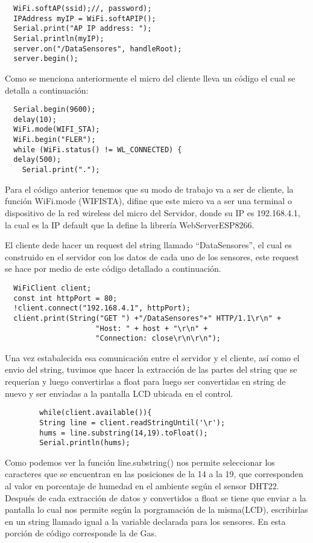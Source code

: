 \documentclass[12pt,letterpaper]{IEEEtran}
\begin{document}
 \begin{lstlisting}
  WiFi.softAP(ssid);//, password);      
  IPAddress myIP = WiFi.softAPIP();    
  Serial.print("AP IP address: ");
  Serial.println(myIP);              
  server.on("/DataSensores", handleRoot);   
  server.begin();
 \end{lstlisting}
 
 Como se menciona anteriormente el micro del cliente lleva un código el cual se detalla a continuación:
 
   \begin{lstlisting}
  Serial.begin(9600);        
  delay(10);                            
  WiFi.mode(WIFI_STA);          
  WiFi.begin("FLER");     
  while (WiFi.status() != WL_CONNECTED) {    
  delay(500);
    Serial.print(".");
   \end{lstlisting}
 Para el código anterior tenemos que su modo de trabajo va a ser de cliente, la función WiFi.mode (WIFI\textunderscore STA), difine que este micro va a ser una terminal o dispositivo de la red wireless del micro del Servidor, donde su IP es 192.168.4.1, la cual es la IP default que la define la librería WebServerESP8266. 

El cliente dede hacer un request del string llamado ``DataSensores'', el cual es construido en el servidor con los datos de cada uno de los sensores, este request se hace por medio de este código detallado a continuación. 
 
  
\begin{lstlisting}
  WiFiClient client;
  const int httpPort = 80;
  !client.connect("192.168.4.1", httpPort);
  client.print(String("GET ") +"/DataSensores"+" HTTP/1.1\r\n" +
                     "Host: " + host + "\r\n" +
                     "Connection: close\r\n\r\n"); 
\end{lstlisting}

Una vez estabalecida esa comunicación entre el servidor y el cliente, así como el envio del string, tuvimos que hacer la extracción de las partes del string que se requerían y luego convertirlas a float para luego ser convertidas en string de nuevo y ser enviadas a la pantalla LCD ubicada en el control.    
   
   
\begin{lstlisting}
        while(client.available()){
        String line = client.readStringUntil('\r');
        hums = line.substring(14,19).toFloat();
        Serial.println(hums);
  \end{lstlisting}
 
Como podemos ver la función line.substring() nos permite seleccionar los caracteres que se encuentran en las posiciones de la 14 a la 19, que corresponden al valor en porcentaje de humedad en el ambiente según el sensor DHT22.
Después de cada extracción de datos y convertidos a float se tiene que enviar a la pantalla lo cual nos permite según la porgramación de la misma(LCD), escribirlas en un string llamado igual a la variable declarada para los sensores. En esta porción de código corresponde la de Gas. 
 
\end{document}
